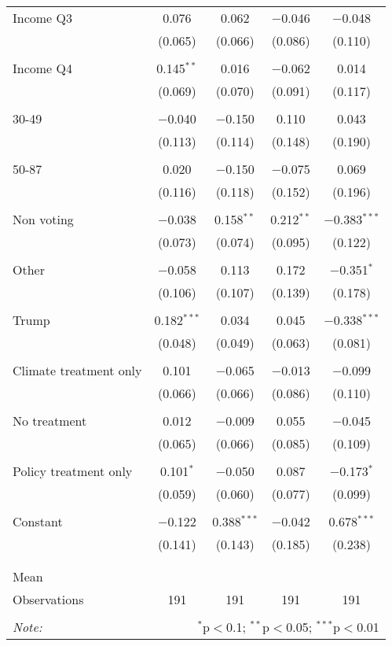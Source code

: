 \begin{tabular}{@{\extracolsep{5pt}}lcccc}
 Income Q3 & 0.076 & 0.062 & $-$0.046 & $-$0.048 \\ 
  & (0.065) & (0.066) & (0.086) & (0.110) \\ 
  & & & & \\ 
 Income Q4 & 0.145$^{**}$ & 0.016 & $-$0.062 & 0.014 \\ 
  & (0.069) & (0.070) & (0.091) & (0.117) \\ 
  & & & & \\ 
 30-49 & $-$0.040 & $-$0.150 & 0.110 & 0.043 \\ 
  & (0.113) & (0.114) & (0.148) & (0.190) \\ 
  & & & & \\ 
 50-87 & 0.020 & $-$0.150 & $-$0.075 & 0.069 \\ 
  & (0.116) & (0.118) & (0.152) & (0.196) \\ 
  & & & & \\ 
 Non voting & $-$0.038 & 0.158$^{**}$ & 0.212$^{**}$ & $-$0.383$^{***}$ \\ 
  & (0.073) & (0.074) & (0.095) & (0.122) \\ 
  & & & & \\ 
 Other & $-$0.058 & 0.113 & 0.172 & $-$0.351$^{*}$ \\ 
  & (0.106) & (0.107) & (0.139) & (0.178) \\ 
  & & & & \\ 
 Trump & 0.182$^{***}$ & 0.034 & 0.045 & $-$0.338$^{***}$ \\ 
  & (0.048) & (0.049) & (0.063) & (0.081) \\ 
  & & & & \\ 
 Climate treatment only & 0.101 & $-$0.065 & $-$0.013 & $-$0.099 \\ 
  & (0.066) & (0.066) & (0.086) & (0.110) \\ 
  & & & & \\ 
 No treatment & 0.012 & $-$0.009 & 0.055 & $-$0.045 \\ 
  & (0.065) & (0.066) & (0.085) & (0.109) \\ 
  & & & & \\ 
 Policy treatment only & 0.101$^{*}$ & $-$0.050 & 0.087 & $-$0.173$^{*}$ \\ 
  & (0.059) & (0.060) & (0.077) & (0.099) \\ 
  & & & & \\ 
 Constant & $-$0.122 & 0.388$^{***}$ & $-$0.042 & 0.678$^{***}$ \\ 
  & (0.141) & (0.143) & (0.185) & (0.238) \\ 
  & & & & \\ 
\hline \\[-1.8ex] 
Mean &  &  &  &  \\ 
Observations & 191 & 191 & 191 & 191 \\ 
\hline 
\hline \\[-1.8ex] 
\textit{Note:}  & \multicolumn{4}{r}{$^{*}$p$<$0.1; $^{**}$p$<$0.05; $^{***}$p$<$0.01} \\ 
\end{tabular} 
